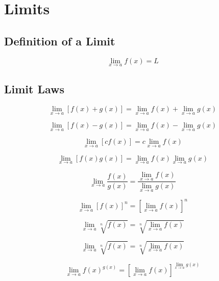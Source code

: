 \documentclass{book}
\begin{document}
\section{Limits}
\subsection{Definition of a Limit}
\begin{equation}
    \lim_{x \to a} f(x) = L
\end{equation}

\subsection{Limit Laws}
\begin{equation}
    \lim_{x \to a} [f(x) + g(x)] = \lim_{x \to a} f(x) + \lim_{x \to a} g(x)
\end{equation}

\begin{equation}
    \lim_{x \to a} [f(x) - g(x)] = \lim_{x \to a} f(x) - \lim_{x \to a} g(x)
\end{equation}

\begin{equation}
    \lim_{x \to a} [cf(x)] = c \lim_{x \to a} f(x)
\end{equation}

\begin{equation}
    \lim_{x \to a} [f(x)g(x)] = \lim_{x \to a} f(x) \lim_{x \to a} g(x)
\end{equation}

\begin{equation}
    \lim_{x \to a} \frac{f(x)}{g(x)} = \frac{\lim_{x \to a} f(x)}{\lim_{x \to a} g(x)}
\end{equation}

\begin{equation}
    \lim_{x \to a} [f(x)]^n = [\lim_{x \to a} f(x)]^n
\end{equation}

\begin{equation}
    \lim_{x \to a} \sqrt[n]{f(x)} = \sqrt[n]{\lim_{x \to a} f(x)}
\end{equation}

\begin{equation}
    \lim_{x \to a} \sqrt[n]{f(x)} = \sqrt[n]{\lim_{x \to a} f(x)}
\end{equation}

\begin{equation}
    \lim_{x \to a} f(x)^{g(x)} = \left[\lim_{x \to a} f(x)\right]^{\lim_{x \to a} g(x)}
\end{equation}
\end{document}
